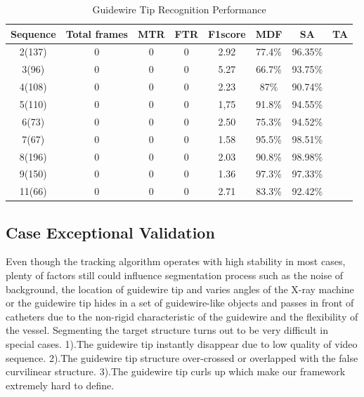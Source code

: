 \documentclass[journal]{IEEEtran}
\begin{document}
\begin{table}[!htb]
	\centering
	\caption{Guidewire Tip Recognition Performance}
	\begin{tabular}{cccccccc}
	\hline
	\multirow{1}{*}{Sequence}&\cr
	Total frames& MTR& FTR& F1score& MDF& SA & TA\\
	\hline
	2(137)&0&0&0&2.92&77.4\%&96.35\% \\
	3(96)&0&0&0&5.27&66.7\%&93.75\%\\
	4(108)&0&0&0&2.23&87\%&90.74\%\\
	5(110)&0&0&0&1,75&91.8\%&94.55\%\\
	6(73)&0&0&0&2.50&75.3\%&94.52\%\\
	7(67)&0&0&0&1.58&95.5\%&98.51\%\\
	8(196)&0&0&0&2.03&90.8\%&98.98\%\\
	9(150)&0&0&0&1.36&97.3\%&97.33\%\\
	11(66)&0&0&0&2.71&83.3\%&92.42\%\\
	\hline
	\end{tabular}
\end{table}

\subsection{Case Exceptional Validation}
Even though the tracking algorithm operates with high stability in most cases, plenty of factors still could influence segmentation process such as the noise of background, the location of guidewire tip and varies angles of the X-ray machine or the guidewire tip hides in a set of guidewire-like objects and passes in front of catheters due to the non-rigid characteristic of the guidewire and the flexibility of the vessel. Segmenting the target structure turns out to be very difficult in special cases. 1).The guidewire tip instantly disappear due to low quality of video sequence.
2).The guidewire tip structure over-crossed or overlapped with the false curvilinear structure.
3).The guidewire tip curls up which make our framework extremely hard to define.
\end{document}
